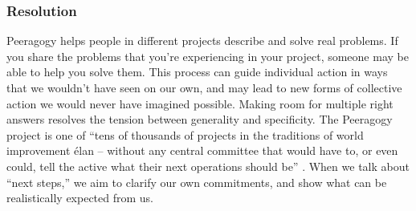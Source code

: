 

\subsubsection*{Resolution}
Peeragogy helps people in different projects describe and solve real problems. 
If you share the problems that you're experiencing in your project, someone may be able to help you solve them.
This process can guide individual action in ways that we wouldn't have seen on our own, and may lead to new forms of collective action we would never have imagined possible.
%
Making room for multiple right answers resolves the tension between generality and specificity.
The Peeragogy project is one of ``tens of thousands of projects in the traditions of world improvement \'elan -- without any central committee that would have to, or even could, tell the active what their next operations should be'' \cite[p. 402]{sloterdijk2013change}.  When we talk about ``next steps,'' we aim to clarify our own commitments, and show what can be realistically expected from us.

